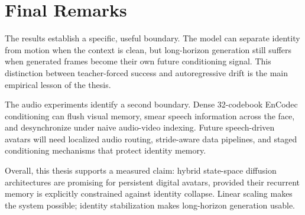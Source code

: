 \documentclass[12pt,letterpaper]{report}
\begin{document}
\section{Final Remarks}
The results establish a specific, useful boundary. The model can separate identity from motion when the context is clean, but long-horizon generation still suffers when generated frames become their own future conditioning signal. This distinction between teacher-forced success and autoregressive drift is the main empirical lesson of the thesis.

The audio experiments identify a second boundary. Dense 32-codebook EnCodec conditioning can flush visual memory, smear speech information across the face, and desynchronize under naive audio-video indexing. Future speech-driven avatars will need localized audio routing, stride-aware data pipelines, and staged conditioning mechanisms that protect identity memory.

Overall, this thesis supports a measured claim: hybrid state-space diffusion architectures are promising for persistent digital avatars, provided their recurrent memory is explicitly constrained against identity collapse. Linear scaling makes the system possible; identity stabilization makes long-horizon generation usable.



\end{document}
